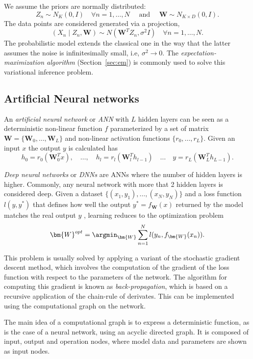 We assume the priors are normally distributed:
\[
  Z_{n} \sim N_{K}(0, I) \quad \forall n =1,\dots,N \quad \text{ and } \quad \bm{W} \sim N_{K\times D}(0, I).
\]
The data points are considered generated via a projection,
\[
  (X_{n} \mid Z_{n}, \bm{W}) \sim N(\bm{W}^{T}Z_{n}, \sigma^{2}I)\quad \forall n = 1,\dots, N.
\]
The probabilistic model extends the classical one in the way that the latter assumes the noise is infinitesimally small, i.e, \(\sigma^{2} \to 0\). The \emph{expectation-maximization algorithm} (Section~\ref{sec:em}) is commonly used to solve this variational inference problem.



\subsection{Artificial Neural networks}

An \emph{artificial neural network} or \emph{ANN} with \(L\) hidden layers can be seen as a deterministic non-linear function \(f\) parameterized by a set of matrix \(\bm{W} = \{\bm{W}_{0},\dots, \bm{W}_{L}\}\) and non-linear activation functions \(\{r_{0},\dots, r_{L}\}\). Given an input \(x\) the output \(y\) is calculated has
\[
  h_{0} = r_{0}(\bm{W}^{T}_{0}x), \quad \dots, \quad h_{l} = r_{l}(\bm{W}_{l}^{T}h_{l-1}) \quad \dots \quad y = r_{L}(\bm{W}_{L}^{T}h_{L-1}).
\]

\emph{Deep neural networks} or \emph{DNNs} are ANNs where the number of hidden layers is higher. Commonly, any neural network with more that 2 hidden layers is considered deep. Given a dataset \(\{(x_{1}, y_{1}), \dots, (x_{N}, y_{N})\}\) and a loss function \(l(y,y^{*})\) that defines how well the output \(y^{*} = f_{\bm{W}}(x)\)  returned by the model matches the real output \(y\) , learning reduces to the optimization problem
\[
  \bm{W}^{opt} = \argmin_{\bm{W}} \sum_{n=1}^{N}l(y_{n}, f_{\bm{W}}(x_{n})).
\]

This problem is usually solved by applying a variant of the stochastic gradient descent method, which involves the computation of the gradient of the loss function with respect to the parameters of the network. The algorithm for computing this gradient is known as \emph{back-propagation}, which is based on a recursive application of the chain-rule of derivates. This can be implemented using the computational graph on the network.

The main idea of a computational graph is to express a deterministic function, as is the case of a neural network, using an acyclic directed graph. It is composed of input, output and operation nodes, where model data and parameters are shown as input nodes.

